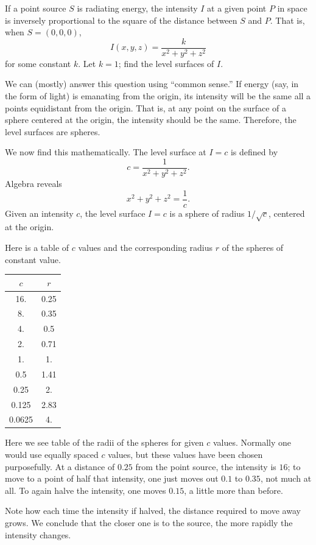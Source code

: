 \documentclass{ximera}
\begin{document}
\begin{example}
  If a point source $S$ is radiating energy, the intensity $I$ at a
  given point $P$ in space is inversely proportional to the square of
  the distance between $S$ and $P$. That is, when $S=(0,0,0)$,
  \[
  I(x,y,z) = \frac{k}{x^2+y^2+z^2}
  \]
  for some constant $k$.  Let $k=1$; find the level surfaces of $I$.
  \begin{explanation}
    We can (mostly) answer this question using ``common sense.'' If energy
    (say, in the form of light) is emanating from the origin, its
    intensity will be the same all a points equidistant from the
    origin. That is, at any point on the surface of a sphere centered at
    the origin, the intensity should be the same. Therefore, the level
    surfaces are spheres.
    
    We now find this mathematically. The level surface at $I=c$ is defined by 
    \[
    c = \frac{1}{x^2+y^2+z^2}.
    \]
    Algebra reveals
    \[
    x^2+y^2+z^2 = \frac1c.
    \]
    Given an intensity $c$, the level surface $I=c$ is a sphere of
    radius $1/\sqrt{c}$, centered at the origin.
    
    Here is a table of $c$ values and the corresponding radius $r$ of
    the spheres of constant value.
      \begin{tabular}{cc}
        $c$ & $r$ \\ \hline
        16. & 0.25 \\
        8. & 0.35 \\
        4. & 0.5 \\
        2. & 0.71 \\
        1. & 1. \\
        0.5 & 1.41 \\
        0.25 & 2. \\
        0.125 & 2.83 \\
        0.0625 & 4. \\
      \end{tabular}
    
    Here we see table of the radii of the spheres for given $c$
    values. Normally one would use equally spaced $c$ values, but
    these values have been chosen purposefully. At a distance of
    $0.25$ from the point source, the intensity is $16$; to move to a
    point of half that intensity, one just moves out $0.1$ to $0.35$,
    not much at all. To again halve the intensity, one moves $0.15$, a
    little more than before.
 
    Note how each time the intensity if halved, the distance required
    to move away grows. We conclude that the closer one is to the
    source, the more rapidly the intensity changes.
  \end{explanation}
\end{example}
\end{document}
